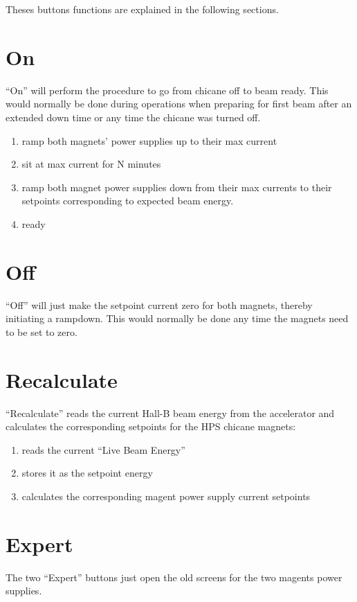 \documentclass[amsmath,amssymb,notitlepage,12pt]{revtex4-1}
\begin{document}
Theses buttons functions are explained in the following sections.

\section{On}
``On'' will perform the procedure to go from chicane off to beam ready.  This would normally be done during operations when preparing for first beam after an extended down time or any time the chicane was turned off.
\begin{enumerate}
    \item ramp both magnets' power supplies up to their max current
    \item sit at max current for N minutes
    \item ramp both magnet power supplies down from their max currents to their setpoints corresponding to expected beam energy.
    \item ready
\end{enumerate}

\section{Off}
``Off'' will just make the setpoint current zero for both magnets, thereby initiating a rampdown.  This would normally be done any time the magnets need to be set to zero.

\section{Recalculate}
``Recalculate'' reads the current Hall-B beam energy from the accelerator and calculates the corresponding setpoints for the HPS chicane magnets:
\begin{enumerate}
    \item reads the current ``Live Beam Energy''
    \item stores it as the setpoint energy
    \item calculates the corresponding magent power supply current setpoints
\end{enumerate}

\section{Expert}
The two ``Expert'' buttons just open the old screens for the two magents power supplies.
\end{document}
